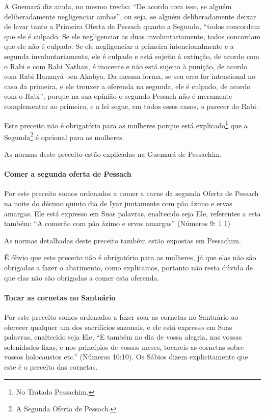 A Guemará diz ainda, no mesmo trecho: ``De acordo com isso, se alguém
deliberadamente negligenciar ambas'', ou seja, se alguém deliberadamente
deixar de levar tanto a Primeira Oferta de Pessach quanto a Segunda,
``todos concordam que ele é culpado. Se ele negligenciar as duas
involuntariamente, todos concordam que ele não é culpado. Se ele
negligenciar a primeira intencionalmente e a segunda involuntariamente,
ele é culpado e está sujeito à extinção, de acordo com o Rabi e com Rabi
Nathan, é inocente e não está sujeito à punição, de acordo com Rabi
Hananyá ben Akabya. Da mesma forma, se seu erro for intencional no caso
da primeira, e ele trouxer a oferenda na segunda, ele é culpado, de
acordo com o Rabi'', porque na sua opinião o segundo Pessach não é
meramente complementar ao primeiro, e a lei segue, em todos esses casos,
o parecer do Rabi.

Este preceito não é obrigatório para as mulheres porque está explicado\footnote{No Tratado Pessachim.} que a Segunda\footnote{A Segunda Oferta de Pessach.} é opcional para as mulheres.

As normas deste preceito estão explicadas na Guemará de Pessachim.

\paragraph{Comer a segunda oferta de Pessach}

Por este preceito somos ordenados a comer a carne da segunda Oferta de
Pessach na noite do décimo quinto dia de Iyar juntamente com pão
ázimo e ervas amargas. Ele está expresso em Suas palavras, enaltecido
seja Ele, referentes a esta também: ``A comerão com pão ázimo e ervas
amargas'' (Números 9: 1 1)

As normas detalhadas deste preceito também estão expostas em Pessachim.

É óbvio que este preceito não é obrigatório para as mulheres, já que
elas não são obrigadas a fazer o abatimento, como explicamos, portanto
não resta dúvida de que elas não são obrigadas a comer esta oferenda.

\paragraph{Tocar as cornetas no Santuário}

Por este preceito somos ordenados a fazer soar as cornetas no Santuário
ao oferecer qualquer um dos sacrifícios sazonais, e ele está expresso em
Suas palavras, enaltecido seja Ele, ``E também no dia de vossa alegria,
nas vossas solenidades fixas, e nos princípios de vossos meses,
tocareis as cornetas sobre vossos holocaustos etc.'' (Números 10:10).
Os Sábios dizem explicitamente que este é o preceito das cornetas.

